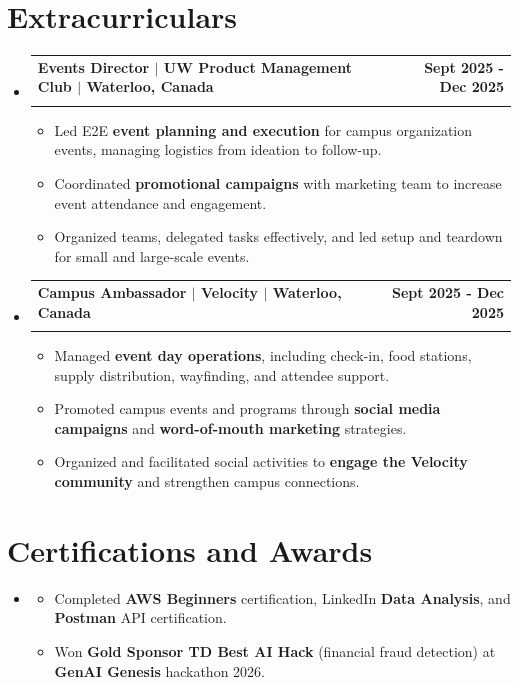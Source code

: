 \documentclass[letterpaper,10pt]{article}
\makeatletter
\newcommand{\resumeItem}[1]{
  \item\small{
    {#1 \vspace{-1pt}}
  }
}
\newcommand{\resumeSubheading}[4]{
  \vspace{-1pt}\item
    \begin{tabular*}{1.0\textwidth}[t]{l@{\extracolsep{\fill}}r}
      \textbf{#1} & \textbf{\small #2} \\
      \textit{\small#3} & \textit{\small #4} \\[-2pt]
    \end{tabular*}\vspace{-7pt}
}
\newcommand{\resumeSubHeadingListStart}{\begin{itemize}[leftmargin=0.0in, label={}]}
\newcommand{\resumeSubHeadingListEnd}{\end{itemize}}
\newcommand{\resumeItemListStart}{\begin{itemize}[leftmargin=0.15in, topsep=1pt, itemsep=0.5pt, parsep=0pt, partopsep=0pt]}
\newcommand{\resumeItemListEnd}{\end{itemize}\vspace{0pt}}
\makeatother
\begin{document}
\section{Extracurriculars}
  \resumeSubHeadingListStart
    \resumeSubheading
      {Events Director $|$ UW Product Management Club $|$ Waterloo, Canada}{Sept 2025 - Dec 2025}
      {}{}
      \vspace{-6pt}
      \resumeItemListStart
      \vspace{0pt}
        \resumeItem{Led E2E \textbf{event planning and execution} for campus organization events, managing logistics from ideation to follow-up.}
        \vspace{-2pt}
        \resumeItem{Coordinated \textbf{promotional campaigns} with marketing team to increase event attendance and engagement.}
        \vspace{-2pt}
        \resumeItem{Organized teams, delegated tasks effectively, and led setup and teardown for small and large-scale events.}
      \resumeItemListEnd
    \resumeSubheading
      {Campus Ambassador $|$ Velocity $|$ Waterloo, Canada}{Sept 2025 - Dec 2025}
      {}{}
      \vspace{-6pt}
      \resumeItemListStart
        \resumeItem{Managed \textbf{event day operations}, including check-in, food stations, supply distribution, wayfinding, and attendee support.}
        \vspace{-2pt}
        \resumeItem{Promoted campus events and programs through \textbf{social media campaigns} and \textbf{word-of-mouth marketing} strategies.}
        \vspace{-2pt}
        \resumeItem{Organized and facilitated social activities to \textbf{engage the Velocity community} and strengthen campus connections.}
      \resumeItemListEnd
      \vspace{-2pt}
  \resumeSubHeadingListEnd
\vspace{0pt}
\section{Certifications and Awards}
    \resumeSubHeadingListStart
      \item[]
          \resumeItemListStart
            \resumeItem{Completed \textbf{AWS Beginners} certification, LinkedIn \textbf{Data Analysis}, and \textbf{Postman} API certification.}
            \resumeItem{Won \textbf{Gold Sponsor TD Best AI Hack} (financial fraud detection) at \textbf{GenAI Genesis} hackathon 2026.}
          \resumeItemListEnd
   \resumeSubHeadingListEnd
\vfill
\null
\end{document}
